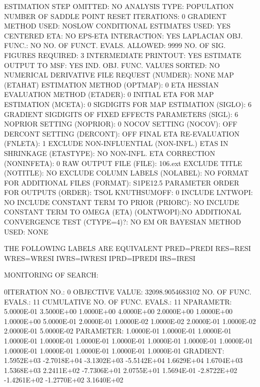 \documentclass[
  letterpaper,
  toc=chapterentrywithdots,
  listof=totoc,
  11pt,
  headings=small,
  usegeometry]{scrreprt}
\begin{document}
\begin{nonmemlisting}
 ESTIMATION STEP OMITTED:                 NO
 ANALYSIS TYPE:                           POPULATION
 NUMBER OF SADDLE POINT RESET ITERATIONS:      0
 GRADIENT METHOD USED:               NOSLOW
 CONDITIONAL ESTIMATES USED:              YES
 CENTERED ETA:                            NO
 EPS-ETA INTERACTION:                     YES
 LAPLACIAN OBJ. FUNC.:                    NO
 NO. OF FUNCT. EVALS. ALLOWED:            9999
 NO. OF SIG. FIGURES REQUIRED:            3
 INTERMEDIATE PRINTOUT:                   YES
 ESTIMATE OUTPUT TO MSF:                  YES
 IND. OBJ. FUNC. VALUES SORTED:           NO
 NUMERICAL DERIVATIVE
       FILE REQUEST (NUMDER):               NONE
 MAP (ETAHAT) ESTIMATION METHOD (OPTMAP):   0
 ETA HESSIAN EVALUATION METHOD (ETADER):    0
 INITIAL ETA FOR MAP ESTIMATION (MCETA):    0
 SIGDIGITS FOR MAP ESTIMATION (SIGLO):      6
 GRADIENT SIGDIGITS OF
       FIXED EFFECTS PARAMETERS (SIGL):     6
 NOPRIOR SETTING (NOPRIOR):                 0
 NOCOV SETTING (NOCOV):                     OFF
 DERCONT SETTING (DERCONT):                 OFF
 FINAL ETA RE-EVALUATION (FNLETA):          1
 EXCLUDE NON-INFLUENTIAL (NON-INFL.) ETAS
       IN SHRINKAGE (ETASTYPE):             NO
 NON-INFL. ETA CORRECTION (NONINFETA):      0
 RAW OUTPUT FILE (FILE): 106.ext
 EXCLUDE TITLE (NOTITLE):                   NO
 EXCLUDE COLUMN LABELS (NOLABEL):           NO
 FORMAT FOR ADDITIONAL FILES (FORMAT):      S1PE12.5
 PARAMETER ORDER FOR OUTPUTS (ORDER):       TSOL
 KNUTHSUMOFF:                               0
 INCLUDE LNTWOPI:                           NO
 INCLUDE CONSTANT TERM TO PRIOR (PRIORC):   NO
 INCLUDE CONSTANT TERM TO OMEGA (ETA) (OLNTWOPI):NO
 ADDITIONAL CONVERGENCE TEST (CTYPE=4)?:    NO
 EM OR BAYESIAN METHOD USED:                 NONE


 THE FOLLOWING LABELS ARE EQUIVALENT
 PRED=PREDI
 RES=RESI
 WRES=WRESI
 IWRS=IWRESI
 IPRD=IPREDI
 IRS=IRESI

 MONITORING OF SEARCH:


0ITERATION NO.:    0    OBJECTIVE VALUE:   32098.9054683102        NO. OF FUNC. EVALS.:  11
 CUMULATIVE NO. OF FUNC. EVALS.:       11
 NPARAMETR:  5.0000E-01  3.5000E+00  1.0000E+00  4.0000E+00  2.0000E+00  1.0000E+00  1.0000E+00  5.0000E-01  2.0000E-01  1.0000E-02
             1.0000E-02  2.0000E-01  1.0000E-02  2.0000E-01  5.0000E-02
 PARAMETER:  1.0000E-01  1.0000E-01  1.0000E-01  1.0000E-01  1.0000E-01  1.0000E-01  1.0000E-01  1.0000E-01  1.0000E-01  1.0000E-01
             1.0000E-01  1.0000E-01  1.0000E-01  1.0000E-01  1.0000E-01
 GRADIENT:   1.5952E+03 -2.7018E+04 -3.1302E+03 -5.5142E+04  1.6629E+04  1.6704E+03  1.5368E+03  2.2411E+02 -7.7306E+01  2.0755E+01
             1.5694E-01 -2.8722E+02 -1.4261E+02 -1.2770E+02  3.1640E+02


\end{nonmemlisting}
\end{document}
